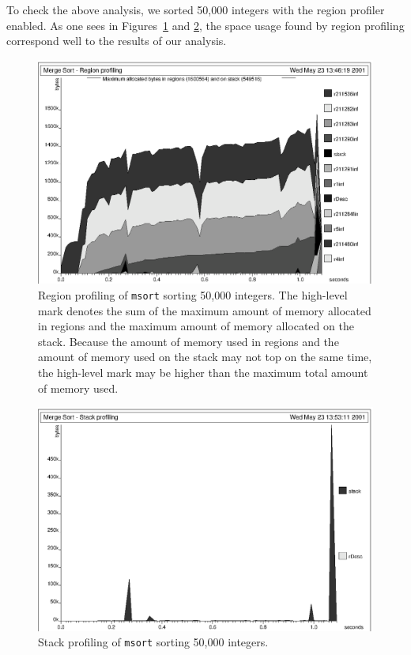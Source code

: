 \documentclass[12pt]{book}
\begin{document}
To check the above analysis, we sorted 50,000 integers with the region
profiler enabled.  As one sees in Figures~\ref{msortregion.fig} and
\ref{msortstack.fig}, the space usage found by region profiling
correspond well to the results of our analysis.
\begin{figure}%
\begin{center}
\includegraphics{msortregion.ps}
\end{center}
\caption{Region profiling of {\tt msort} sorting 50,000
  integers. The high-level mark denotes the sum of the maximum amount
  of memory allocated in regions and the maximum amount of memory allocated
  on the stack. Because the amount of memory used in regions and the
  amount of memory used on the stack may not top on the same time, the
  high-level mark may be higher than the maximum total amount of
  memory used.}
\label{msortregion.fig}
\end{figure}

\begin{figure}%
\begin{center}
\includegraphics{msortstack.ps}
\end{center}
\caption{Stack profiling of {\tt msort} sorting 50,000
integers.}
\label{msortstack.fig}
\end{figure}
\end{document}
